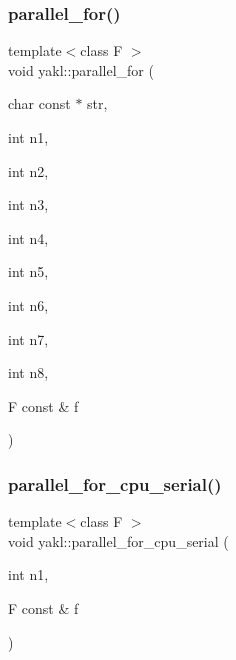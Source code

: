 \mbox{\label{namespaceyakl_a682ed571a33d1b0f00e6edbc2e1e7329}} 
\subsubsection{\texorpdfstring{parallel\+\_\+for()}{parallel\_for()}\hspace{0.1cm}{\footnotesize\ttfamily [16/16]}}
{\footnotesize\ttfamily template$<$class F $>$ \\
void yakl\+::parallel\+\_\+for (\begin{DoxyParamCaption}\item[{char const $\ast$}]{str,  }\item[{int}]{n1,  }\item[{int}]{n2,  }\item[{int}]{n3,  }\item[{int}]{n4,  }\item[{int}]{n5,  }\item[{int}]{n6,  }\item[{int}]{n7,  }\item[{int}]{n8,  }\item[{F const \&}]{f }\end{DoxyParamCaption})\hspace{0.3cm}{\ttfamily [inline]}}

\mbox{\label{namespaceyakl_abcbee87ad306ddf8ab2ee17caeae2e8b}} 
\subsubsection{\texorpdfstring{parallel\+\_\+for\+\_\+cpu\+\_\+serial()}{parallel\_for\_cpu\_serial()}\hspace{0.1cm}{\footnotesize\ttfamily [1/8]}}
{\footnotesize\ttfamily template$<$class F $>$ \\
void yakl\+::parallel\+\_\+for\+\_\+cpu\+\_\+serial (\begin{DoxyParamCaption}\item[{int}]{n1,  }\item[{F const \&}]{f }\end{DoxyParamCaption})\hspace{0.3cm}{\ttfamily [inline]}}

